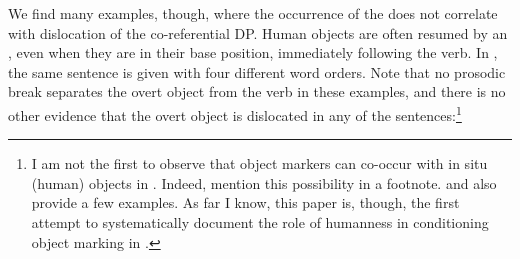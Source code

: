 \documentclass[output=paper]{LSP/langsci}
\begin{document}
\noindent We find many examples, though, where the occurrence of the  does not correlate with dislocation of the co-referential DP. 
Human objects are often resumed by an , even when they are in their base position, immediately following the verb. 
In , the same sentence is given with four different word orders. 
Note that no prosodic break separates the overt object from the verb in these examples, and there is no other evidence that the overt object is dislocated in any of the sentences:\footnote{I am not the first to observe that object markers can co-occur with in situ (human) objects in . 
Indeed, \citet{Bresnanetal1987Topic} mention this possibility in a footnote. 
\citet{Bentley1994Syntactic} and \citet{Henderson2006Syntax} also provide a few examples. 
As far I know, this paper is, though, the first attempt to systematically document the role of humanness in conditioning object marking in .} 

\newpage 
\end{document}
